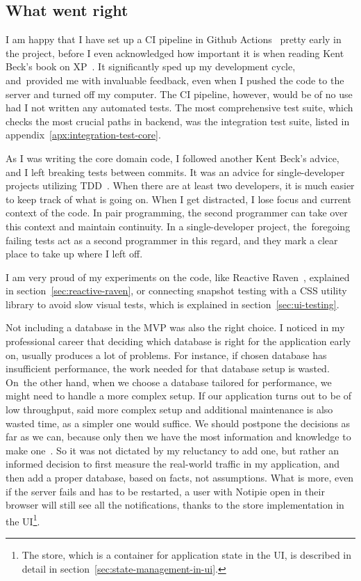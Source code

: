 \subsection{What went right}\label{sec:what-went-right}

I am happy that I have set up a \ac{CI} pipeline
in Github Actions~\cite{github_inc_github_2022-1}
pretty early in the project,
before I even acknowledged how important it is
when reading Kent Beck's book on \ac{XP}~\cite{beck_extreme_2004}.
It significantly sped up my development cycle,
and~provided me with invaluable feedback,
even when I pushed the code to the server
and turned off my computer.
The \ac{CI} pipeline, however,
would be of no use had I not written
any automated tests.
The most comprehensive test suite,
which checks the most crucial paths
in backend,
was the integration test suite,
listed in appendix~\ref{apx:integration-test-core}.

As I was writing the core domain code,
I followed another Kent Beck's advice,
and I left breaking tests between commits.
It was an advice for single-developer projects
utilizing \ac{TDD}~\cite{beck_test-driven_2002}.
When there are at least two developers,
it is much easier to keep track of what is going on.
When I get distracted,
I lose focus and current context of the code.
In pair programming,
the second programmer can take over this context
and maintain continuity.
In a single-developer project,
the~foregoing failing tests act as a second programmer
in this regard,
and they mark a clear place
to take up where I left off.

I am very proud of my experiments
on the code,
like Reactive Raven~\cite{sewera_reactive_2022},
explained in section~\ref{sec:reactive-raven},
or connecting snapshot testing
with a \ac{CSS} utility library
to avoid slow visual tests,
which is explained in section~\ref{sec:ui-testing}.

Not including a database in the \ac{MVP}
was also the right choice.
I noticed in my professional career that
deciding which database is right for the application early on,
usually produces a lot of problems.
For instance,
if chosen database has insufficient performance,
the work needed for that database setup is wasted.
On~the other hand,
when we choose a database tailored for performance,
we might need to handle a more complex setup.
If our application turns out to be of low throughput,
said more complex setup and additional maintenance
is also wasted time,
as a simpler one would suffice.
We should postpone the decisions as far as we can,
because only then we have the most information
and knowledge to make one~\cite{erder_principle_2016}.
So it was not dictated
by my reluctancy to add one,
but rather an informed decision
to first measure the real-world traffic
in my application,
and then add a proper database,
based on facts, not assumptions.
What is more,
even if the server fails and has to be restarted,
a user with Notipie open in their browser
will still see all the notifications,
thanks to the store implementation in the \ac{UI}\footnote{
  The store,
  which is a container for application state in the \ac{UI},
  is described in detail in section~\ref{sec:state-management-in-ui}.
}.
